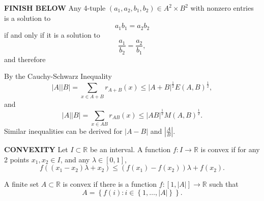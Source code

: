 \documentclass[12pt]{amsart}
\begin{document}

\textbf{FINISH BELOW}
Any 4-tuple \((a_1,a_2,b_1,b_2) \in A^{2} \times B^{2}\) with nonzero entries is a solution to
\[
    a_1b_1 = a_2b_2
\]
if and only if it is a solution to
\[
    \frac{a_1}{b_2} = \frac{a_2}{b_1} 
,\]
and therefore


By the Cauchy-Schwarz Inequality
\[
    \left\lvert A \right\rvert \left\lvert B \right\rvert = \sum _{x \in A + B} r_{A + B} (x) \leq \left\lvert A + B \right\rvert ^{\frac{1}{2} } E(A,B)^{\frac{1}{2} }
,\]
and
\[
    \left\lvert A \right\rvert \left\lvert B \right\rvert = \sum _{x \in AB} r_{AB} (x) \leq \left\lvert AB \right\rvert ^{\frac{1}{2} }M(A,B)^{\frac{1}{2} }
.\]
Similar inequalities can be derived for \(\left\lvert A-B \right\rvert \) and \(\left\lvert \frac{A}{B}  \right\rvert \).



\textbf{CONVEXITY}
Let \(I \subset \mathbb{R} \) be an interval. 
    A function \(f: I \to \mathbb{R} \) is convex if for
    any 2 points \(x_1,x_2 \in I\), and any \(\lambda \in [0,1]\),
    \[
        f((x_1-x_2)\lambda + x_2) \leq \left( f(x_1)-f(x_2) \right) \lambda + f(x_2)
    .\]

    A finite set \(A \subset \mathbb{R}\) is convex if there is a function \(f: [1, \left\lvert A \right\rvert ] \to \mathbb{R} \)
such that
\[
    A = \left\{ f(i) : i \in \left\{ 1, \dots , \left\lvert A \right\rvert  \right\}  \right\} 
.\]

\end{document}
